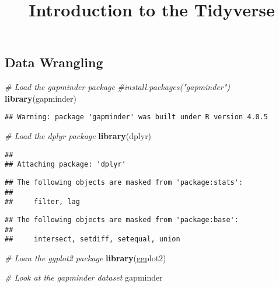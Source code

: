 \documentclass[
]{article}
\title{Introduction to the Tidyverse}
\author{}
\date{\vspace{-2.5em}}
\newenvironment{Shaded}{\begin{snugshade}}{\end{snugshade}}
\newcommand{\CommentTok}[1]{\textcolor[rgb]{0.56,0.35,0.01}{\textit{#1}}}
\newcommand{\KeywordTok}[1]{\textcolor[rgb]{0.13,0.29,0.53}{\textbf{#1}}}
\newcommand{\NormalTok}[1]{#1}
\begin{document}
\maketitle

\hypertarget{data-wrangling}{%
\subsection{Data Wrangling}\label{data-wrangling}}

\begin{Shaded}
\begin{Highlighting}[]
\CommentTok{# Load the gapminder package}
\CommentTok{#install.packages("gapminder")}
\KeywordTok{library}\NormalTok{(gapminder)}
\end{Highlighting}
\end{Shaded}

\begin{verbatim}
## Warning: package 'gapminder' was built under R version 4.0.5
\end{verbatim}

\begin{Shaded}
\begin{Highlighting}[]
\CommentTok{# Load the dplyr package}
\KeywordTok{library}\NormalTok{(dplyr)}
\end{Highlighting}
\end{Shaded}

\begin{verbatim}
## 
## Attaching package: 'dplyr'
\end{verbatim}

\begin{verbatim}
## The following objects are masked from 'package:stats':
## 
##     filter, lag
\end{verbatim}

\begin{verbatim}
## The following objects are masked from 'package:base':
## 
##     intersect, setdiff, setequal, union
\end{verbatim}

\begin{Shaded}
\begin{Highlighting}[]
\CommentTok{# Loan the ggplot2 package}
\KeywordTok{library}\NormalTok{(ggplot2)}

\CommentTok{# Look at the gapminder dataset}
\NormalTok{gapminder}
\end{Highlighting}
\end{Shaded}
\end{document}
